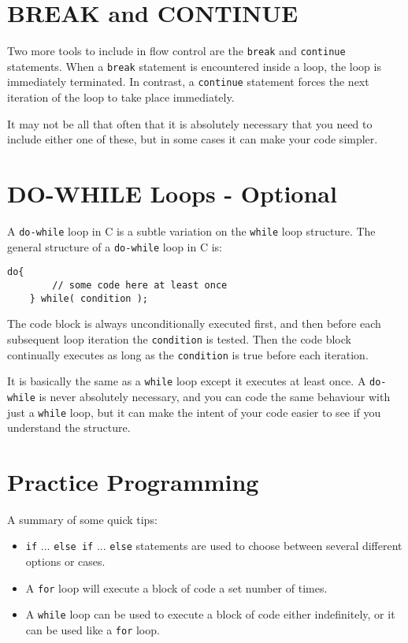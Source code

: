 \documentclass{pass}
\begin{document}
\section*{BREAK and CONTINUE}
Two more tools to include in flow control are the \texttt{break} and \texttt{continue} statements. When a \texttt{break} statement is encountered inside a loop, the loop is immediately terminated. In contrast, a \texttt{continue} statement  forces the next iteration of the loop to take place immediately.

It may not be all that often that it is absolutely necessary that you need to include either one of these, but in some cases it can make your code simpler.

\section*{DO-WHILE Loops - Optional}
A \texttt{do-while} loop in C is a subtle variation on the \texttt{while} loop structure. The general structure of a \texttt{do-while} loop in C is:
\begin{lstlisting}[style=CStyle]
	do{
		// some code here at least once
	} while( condition );
\end{lstlisting}
The code block is always unconditionally executed first, and then before each subsequent loop iteration the \texttt{condition} is tested. Then the code block continually executes as long as the \texttt{condition} is true before each iteration.

It is basically the same as a \texttt{while} loop except it executes at least once. A \texttt{do-while} is never absolutely necessary, and you can code the same behaviour with just a \texttt{while} loop, but it can make the intent of your code easier to see if you understand the structure.

\pagebreak

\section*{Practice Programming}
A summary of some quick tips:
\begin{itemize}
\item \texttt{if} ... \texttt{else if} ... \texttt{else} statements are used to choose between several different options or cases.
\item A \texttt{for} loop will execute a block of code a set number of times.
\item A \texttt{while} loop can be used to execute a block of code either indefinitely, or it can be used like a \texttt{for} loop.
\end{itemize}
\end{document}
